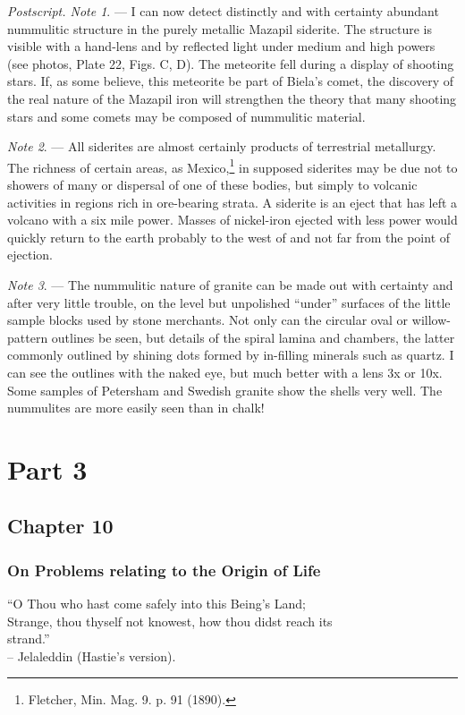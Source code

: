 \documentclass[a4paper, 12pt, oneside, landscape]{article}
\begin{document}
\emph{Postscript. Note 1}. --- I can now detect distinctly and with certainty abundant nummulitic structure in the purely metallic Mazapil siderite. The structure is visible with a hand-lens and by reflected light under medium and high powers (see photos, Plate 22, Figs. C, D). The meteorite fell during a display of shooting stars. If, as some believe, this meteorite be part of Biela's comet, the discovery of the real nature of the Mazapil iron will strengthen the theory that many shooting stars and some comets may be composed of nummulitic material.

\emph{Note 2}. --- All siderites are almost certainly products of terrestrial metallurgy. The richness of certain areas, as Mexico,\footnote{Fletcher, Min. Mag. 9. p. 91 (1890).} in supposed siderites may be due not to showers of many or dispersal of one of these bodies, but simply to volcanic activities in regions rich in ore-bearing strata. A siderite is an eject that has left a volcano with a six mile power. Masses of nickel-iron ejected with less power would quickly return to the earth probably to the west of and not far from the point of ejection.

\emph{Note 3}. --- The nummulitic nature of granite can be made out with certainty and after very little trouble, on the level but unpolished ``under'' surfaces of the little sample blocks used by stone merchants. Not only can the circular oval or willow-pattern outlines be seen, but details of the spiral lamina and chambers, the latter commonly outlined by shining dots formed by in-filling minerals such as quartz. I can see the outlines with the naked eye, but much better with a lens 3x or 10x. Some samples of Petersham and Swedish granite show the shells very well. The nummulites are more easily seen than in chalk!
\clearpage
\section{Part 3}
\subsection{Chapter 10}
\subsubsection{On Problems relating to the Origin of Life}
\begin{displayquote}
``O Thou who hast come safely into this Being's Land;\\Strange, thou thyself not knowest, how thou didst reach its\\strand.''\\-- Jelaleddin (Hastie's version).
\end{displayquote}
\end{document}
